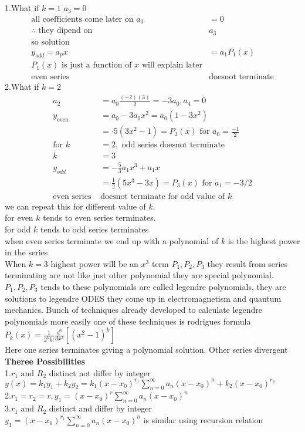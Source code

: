 1.\quad What if $k=1$ \quad $a_3=0$
\begin{align*}
\text{all coefficients come later on }a_3&=0\\
\therefore \text{ they dipend on }&a_3\\
\text{so solution}\\
y_{odd}=a_px&=a_1P_1(x)\\
P_1(x)\text{ is just a function of $x$ will explain later}\\
\text{even series }&\text{doesnot terminate}
\end{align*}
2.\quad What if $k=2$
\begin{align*}
a_2&=a_{0} \frac{(-2)(3)}{2}=-3 a_{0}, a_{4}=0\\
y_{\text {even }}&=a_{0}-3 a_{0} x^{2}=a_{0}\left(1-3 x^{2}\right)\\
&=\cdot 5\left(3 x^{2}-1\right)=P_{2}(x) \text{ for }a_0=\frac{-1}{2}\\
\text{for }k&=2,\text{ odd series doesnot terminate}\\
k&=3\\
y_ {odd} &=-\frac{5}{3} a_1 x^{3}+a_{1} x\\
&=\frac{1}{2}\left(5 x^{3}-3 x\right)=P_{3}(x)\text{ for }a_{1}=-3 / 2\\
\text{even series }&\text{doesnot terminate for odd value of $k$}
\end{align*}
we can repeat this for different value of $k$. \\for even $k$ tends to even series terminates.\\
for odd $k$ tends to odd series terminates\\
when even series terminate we end up with a polynomial of $k$ is the highest power in the series \\
When $k=3$  highest power will be an $x^3$ term $P_1, P_2, P_3$ they result from series terminating are not like just other polynomial they are special polynomial.\\
$P_1, P_2, P_3$ tends to these polynomials are called legendre polynomials, they are solutions to legendre ODES they come up in electromagnetism and quantum mechanics. Bunch of techniques already developed to calculate legendre polynomials more easily one of these techniques is rodrigues formula
$P_{k}(x)=\frac{1}{2^{k} k !} \frac{d^{k}}{d x^{k}}\left[\left(x^{2}-1\right)^{k}\right]$\\
Here one series terminates giving a polynomial solution. Other series divergent\\
\textbf{Theree Possibilities}\\
1.\quad $r_1\text{ and }R_2$ distinct not differ by integer\\
$y(x)=k_1y_1+k_2y_2=k_1(x-x_0)^{r_1}\sum\limits_{n=0}^{\infty}a_n(x-x_0)^n+k_2(x-x_0)^{r_2}$\\
2.\quad $r_1=r_2=r,y_1=(x-x_0)^r\sum_{n=0}^{\infty} a_{n}\left(x-x_{0}\right)^{n}$\\
3.\quad $r_1\text{ and }R_2$ distinct and differ by integer\\
$y_1=(x-x_0)^{r_1}\sum_{n=0}^{\infty} a_{n}\left(x-x_{0}\right)^{n}$ is similar using recursion relation 
